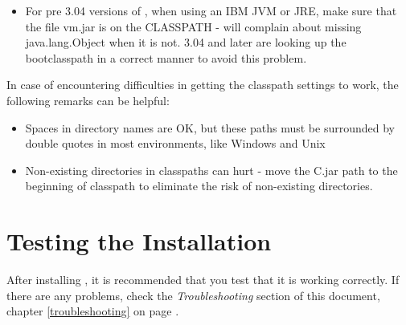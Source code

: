 \begin{itemize}
  modify the environment, and a difference from scripting under the
  \texttt{cmd.exe} processor is that the environment is local to an
  execution unit of a line. When changing the environment is allowed,
  and a Powershell script is used to start the \nr{} translator, this is
  how it can be done:
\begin{lstlisting}
  $env:path = "c:\java\jdk1.8.0_02\bin;\Users\rvj\bin;"
  $env:classpath = ".;\Users\rvj\lib\NetRexxC.jar"
\end{lstlisting}
 \item For pre 3.04 versions of \nr{}, when using an IBM JVM or JRE, make sure that the file vm.jar is
   on the CLASSPATH - \nr{} will complain about missing
   java.lang.Object when it is not. \nr{} 3.04 and later are looking
   up the bootclasspath in a correct manner to avoid this problem.
\end{itemize}

In case of encountering difficulties in getting the classpath settings
to work, the following remarks can be helpful:
\begin{itemize}
\item Spaces in directory names are OK, but these paths must be
  surrounded by double quotes in most environments, like Windows and
  Unix
\item Non-existing directories in classpaths can hurt - move the
  \nr{}C.jar path to the beginning of classpath to eliminate the
  risk of non-existing directories.
\end{itemize}

\section{Testing the \nr{} Installation}\label{testing}
After installing \nr{}, it is recommended that you test that it is
working correctly. If there are any problems, check the
\emph{Troubleshooting} section of this document, chapter
\ref{troubleshooting} on page \pageref{troubleshooting}.

